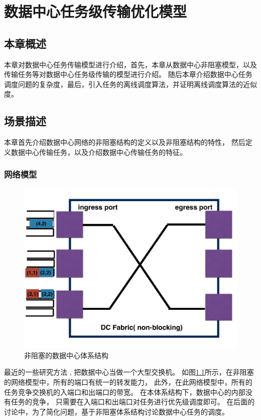 \chapter{数据中心任务级传输优化模型}
\label{cha:mode-taskl}

\section{本章概述}
本章对数据中心任务传输模型进行介绍，首先，本章从数据中心非阻塞模型，以及传输任务等对数据中心任务级传输的模型进行介绍。
随后本章介绍数据中心任务调度问题的复杂度，最后，引入任务的离线调度算法，并证明离线调度算法的近似度。
\section{场景描述}
本章首先介绍数据中心网络的非阻塞结构的定义以及非阻塞结构的特性，
然后定义数据中心传输任务，以及介绍数据中心传输任务的特征。
\subsection{网络模型}
\begin{figure}[b]
\begin{center}
\includegraphics [width=0.9\columnwidth] {figures/DTARGET/picture/system/non-blocking.pdf}
\caption{非阻塞的数据中心体系结构}
\label{erasure-non-blocking-fig}
\end{center}
\end{figure}
最近的一些研究方法 \cite{pFabric,chowdhury2014efficient,huang2016sunflow,chowdhury2015efficient},
把数据中心当做一个大型交换机。
如图\ref{erasure-non-blocking-fig}所示，在非阻塞的网络模型中，所有的端口有统一的转发能力，
此外，在此网络模型中，所有的任务竞争交换机的入端口和出端口的带宽。
在本体系结构下，数据中心的内部没有任务的竞争，
只需要在入端口和出端口对任务进行优先级调度即可。
在后面的讨论中，为了简化问题，基于非阻塞体系结构讨论数据中心任务的调度。



